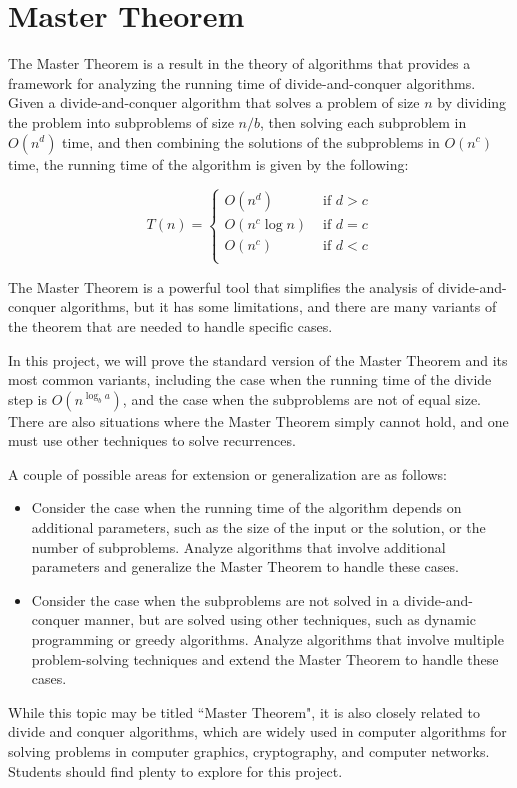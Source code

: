 \documentclass{article}
\begin{document}
\pagebreak

\section{Master Theorem}
    The Master Theorem is a result in the theory of algorithms that provides a framework for analyzing the running time of divide-and-conquer algorithms. Given a divide-and-conquer algorithm that solves a problem of size $n$ by dividing the problem into subproblems of size $n/b$, then solving each subproblem in $O(n^d)$ time, and then combining the solutions of the subproblems in $O(n^c)$ time, the running time of the algorithm is given by the following:

    $$T(n) = \begin{cases}
        O(n^d) & \text{ if }d > c \\
        O(n^c \log n)& \text{ if }d = c \\
        O(n^c) & \text{ if }d < c \\
    \end{cases}$$
    
    The Master Theorem is a powerful tool that simplifies the analysis of divide-and-conquer algorithms, but it has some limitations, and there are many variants of the theorem that are needed to handle specific cases.
    
    \vspace{3mm}
    In this project, we will prove the standard version of the Master Theorem and its most common variants, including the case when the running time of the divide step is $O(n^{\log_b a})$, and the case when the subproblems are not of equal size. There are also situations where the Master Theorem simply cannot hold, and one must use other techniques to solve recurrences.
    
    \vspace{3mm}
    A couple of possible areas for extension or generalization are as follows:
    \begin{itemize}
    \item Consider the case when the running time of the algorithm depends on additional parameters, such as the size of the input or the solution, or the number of subproblems. Analyze algorithms that involve additional parameters and generalize the Master Theorem to handle these cases.
    \item Consider the case when the subproblems are not solved in a divide-and-conquer manner, but are solved using other techniques, such as dynamic programming or greedy algorithms. Analyze algorithms that involve multiple problem-solving techniques and extend the Master Theorem to handle these cases.
    \end{itemize}
    While this topic may be titled ``Master Theorem", it is also closely related to divide and conquer algorithms, which are widely used in computer algorithms for solving problems in computer graphics, cryptography, and computer networks. Students should find plenty to explore for this project.
    
\end{document}
